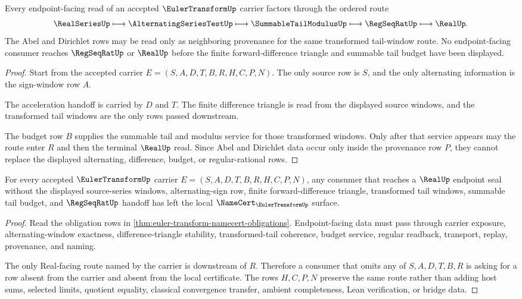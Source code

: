 \begin{theorem}\label{thm:euler-transform-alternating-acceleration-handoff}
Every endpoint-facing read of an accepted $\EulerTransformUp$ carrier factors through the ordered route
$$
\RealSeriesUp \longmapsto \AlternatingSeriesTestUp \longmapsto \SummableTailModulusUp \longmapsto \RegSeqRatUp \longmapsto \RealUp.
$$
The Abel and Dirichlet rows may be read only as neighboring provenance for the same transformed tail-window route. No endpoint-facing consumer reaches $\RegSeqRatUp$ or $\RealUp$ before the finite forward-difference triangle and summable tail budget have been displayed.
\end{theorem}
\begin{proof}
Start from the accepted carrier $E=(S,A,D,T,B,R,H,C,P,N)$. The only source row is $S$, and the only alternating information is the sign-window row $A$.

The acceleration handoff is carried by $D$ and $T$. The finite difference triangle is read from the displayed source windows, and the transformed tail windows are the only rows passed downstream.

The budget row $B$ supplies the summable tail and modulus service for those transformed windows. Only after that service appears may the route enter $R$ and then the terminal $\RealUp$ read. Since Abel and Dirichlet data occur only inside the provenance row $P$, they cannot replace the displayed alternating, difference, budget, or regular-rational rows.
\end{proof}

\begin{theorem}\label{thm:euler-transform-real-seal-nonescape}
For every accepted $\EulerTransformUp$ carrier $E=(S,A,D,T,B,R,H,C,P,N)$, any consumer that reaches a $\RealUp$ endpoint seal without the displayed source-series windows, alternating-sign row, finite forward-difference triangle, transformed tail windows, summable tail budget, and $\RegSeqRatUp$ handoff has left the local $\NameCert_{\EulerTransformUp}$ surface.
\end{theorem}
\begin{proof}
Read the obligation rows in \autoref{thm:euler-transform-namecert-obligations}. Endpoint-facing data must pass through carrier exposure, alternating-window exactness, difference-triangle stability, transformed-tail coherence, budget service, regular readback, transport, replay, provenance, and naming.

The only Real-facing route named by the carrier is downstream of $R$. Therefore a consumer that omits any of $S,A,D,T,B,R$ is asking for a row absent from the carrier and absent from the local certificate. The rows $H,C,P,N$ preserve the same route rather than adding host sums, selected limits, quotient equality, classical convergence transfer, ambient completeness, Lean verification, or bridge data.
\end{proof}

